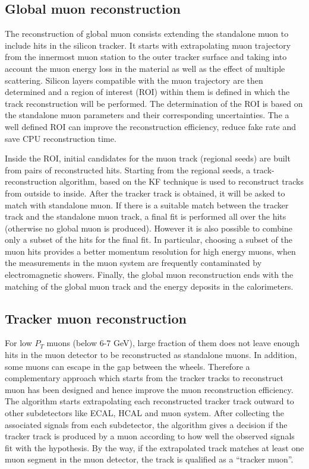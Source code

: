 \subsection{Global muon reconstruction}\label{subsec:Global_muon}
The reconstruction of global muon consists extending the standalone muon to include hits in the silicon tracker. It starts with extrapolating muon trajectory from the innermost muon station to the outer tracker surface and taking into account the muon energy loss in the material as well as the effect of multiple scattering. Silicon layers compatible with the muon trajectory are then determined and a region of interest (ROI) within them is defined in which the track reconstruction will be performed. The determination of the ROI is based on the standalone muon parameters and their corresponding uncertainties. The a well defined ROI can improve the reconstruction efficiency, reduce fake rate and save CPU reconstruction time.

Inside the ROI, initial candidates for the muon track (regional seeds) are built from pairs of reconstructed hits. Starting from the regional seeds, a track-reconstruction algorithm, based on the KF technique is used to reconstruct tracks from outside to inside. After the tracker track is obtained, it will be asked to match with standalone muon. If there is a suitable match between the tracker track and the standalone muon track, a final fit is performed all over the hits (otherwise no global muon is produced). However it is also possible to combine only a subset of the hits for the final fit. In particular, choosing a subset of the muon hits provides a better momentum resolution for high energy muons, when the measurements in the muon system are frequently contaminated by electromagnetic showers. Finally, the global muon reconstruction ends with the matching of the global muon track and the energy deposits in the calorimeters.

\subsection{Tracker muon reconstruction}\label{subsec:Tracker_muon}
For low $P_{T}$ muons (below 6-7 GeV), large fraction of them does not leave enough hits in the muon detector to be reconstructed as standalone muons. In addition, some muons can escape in the gap between the wheels. Therefore a complementary approach which starts from the tracker tracks to reconstruct muon has been
designed \cite{muon_reco_2} and hence improve the muon reconstruction efficiency. The algorithm starts extrapolating each reconstructed tracker track outward to other subdetectors like ECAL, HCAL and muon system. After collecting the associated signals from each subdetector, the algorithm gives a decision if the tracker track is produced by a muon according to how well the observed signals fit with the hypothesis. By the way, if the extrapolated track matches at least one muon segment in the muon detector, the track is qualified as a ``tracker muon''.


